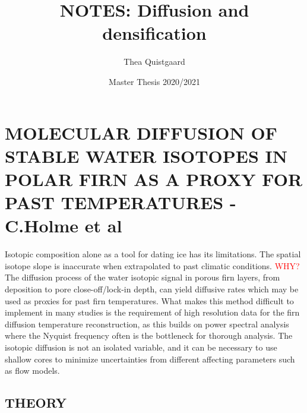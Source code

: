 \documentclass[11pt]{article}
\title{NOTES: Diffusion and densification}
\author{Thea Quistgaard}
\date{Master Thesis 2020/2021}
\begin{document}
\maketitle

\section{MOLECULAR DIFFUSION OF STABLE WATER ISOTOPES IN POLAR FIRN AS A PROXY FOR PAST TEMPERATURES - C.Holme et al}
Isotopic composition alone as a tool for dating ice has its limitations. The spatial isotope slope is inaccurate when extrapolated to past climatic conditions. \textcolor{red}{WHY?}
The diffusion process of the water isotopic signal in porous firn layers, from deposition to pore close-off/lock-in depth, can yield diffusive rates which may be used as proxies for past firn temperatures. What makes this method difficult to implement in many studies is the requirement of high resolution data for the firn diffusion temperature reconstruction, as this builds on power spectral analysis where the Nyquist frequency often is the bottleneck for thorough analysis.
The isotopic diffusion is not an isolated variable, and it can be necessary to use shallow cores to minimize uncertainties from different affecting parameters such as flow models.
\subsection{THEORY}
\end{document}
